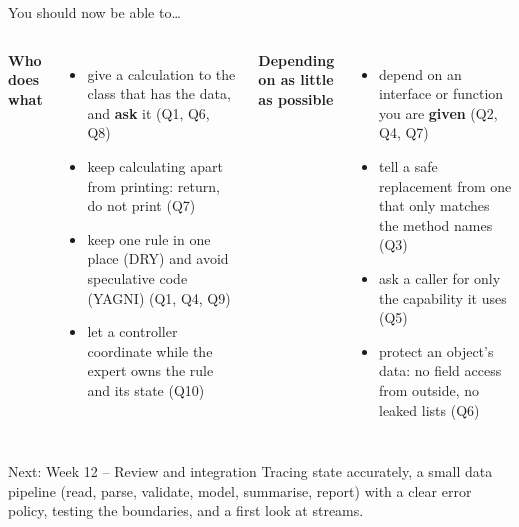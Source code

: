 \documentclass[aspectratio=169]{beamer}
\newcommand{\neutrallabel}[1]{\textcolor{bkblue}{\textbf{#1}}}
\newcommand{\yes}{\textcolor{goodgreen}{\ding{51}}}
\begin{document}
\begin{frame}{You should now be able to\ldots}
  \begin{columns}[T,onlytextwidth]
    \neutrallabel{Who does what}
    \begin{itemize}[itemsep=0.12em]
      \small
      \item[\yes] give a calculation to the class that has the data, and \textbf{ask}
            it (Q1, Q6, Q8)
      \item[\yes] keep calculating apart from printing: return, do not print
            (Q7)
      \item[\yes] keep one rule in one place (DRY) and avoid speculative code (YAGNI)
            (Q1, Q4, Q9)
      \item[\yes] let a controller coordinate while the expert owns the rule
            and its state (Q10)
    \end{itemize}
    \neutrallabel{Depending on as little as possible}
    \begin{itemize}[itemsep=0.12em]
      \small
      \item[\yes] depend on an interface or function you are \textbf{given}
            (Q2, Q4, Q7)
      \item[\yes] tell a safe replacement from one that only matches the method names
            (Q3)
      \item[\yes] ask a caller for only the capability it uses (Q5)
      \item[\yes] protect an object's data: no field access from outside, no leaked
            lists (Q6)
    \end{itemize}
  \end{columns}
  \vspace{0.3em}
  \begin{contextbox}{Next: Week 12 -- Review and integration}
    \footnotesize Tracing state accurately, a small data pipeline (read, parse,
    validate, model, summarise, report) with a clear error policy, testing the
    boundaries, and a first look at streams.
  \end{contextbox}
\end{frame}
\end{document}
